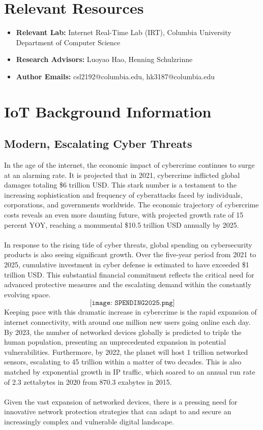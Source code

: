 

\section{Relevant Resources}
\begin{itemize}
    \item \textbf{Relevant Lab:} Internet Real-Time Lab (IRT), Columbia University Department of Computer Science
    \item \textbf{Research Advisors:} Luoyao Hao, Henning Schulzrinne
    \item \textbf{Author Emails:} csl2192@columbia.edu, hk3187@columbia.edu
\end{itemize}


\pagebreak
\section{IoT Background Information}
\subsection{Modern, Escalating Cyber Threats}
In the age of the internet, the economic impact of cybercrime continues to surge at an alarming rate. It is projected that in 2021, cybercrime inflicted global damages totaling \$6 trillion USD. This stark number is a testament to the increasing sophistication and frequency of cyberattacks faced by individuals, corporations, and governments worldwide. The economic trajectory of cybercrime costs reveals an even more daunting future, with projected growth rate of 15 percent YOY, reaching a monumental \$10.5 trillion USD annually by 2025. \\
\\
In response to the rising tide of cyber threats, global spending on cybersecurity products is also seeing significant growth. Over the five-year period from 2021 to 2025, cumulative investment in cyber defense is estimated to have exceeded \$1 trillion USD. This substantial financial commitment reflects the critical need for advanced protective measures and the escalating demand within the constantly evolving space.
$$
\texttt{[image: SPENDING2025.png]}
$$
Keeping pace with this dramatic increase in cybercrime is the rapid expansion of internet connectivity, with around one million new users going online each day. By 2023, the number of networked devices globally is predicted to triple the human population, presenting an unprecedented expansion in potential vulnerabilities. Furthermore, by 2022, the planet will host 1 trillion networked sensors, escalating to 45 trillion within a matter of two decades. This is also matched by exponential growth in IP traffic, which soared to an annual run rate of 2.3 zettabytes in 2020 from 870.3 exabytes in 2015. \\
\\
Given the vast expansion of networked devices, there is a pressing need for innovative network protection strategies that can adapt to and secure an increasingly complex and vulnerable digital landscape. 
